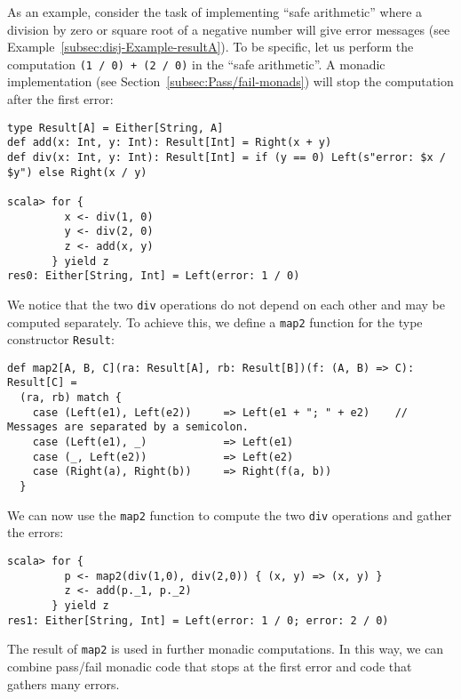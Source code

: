 As an example, consider the task of implementing \textsf{``}safe arithmetic\textsf{''}
where a division by zero or square root of a negative number will
give error messages (see Example~\ref{subsec:disj-Example-resultA}).
To be specific, let us perform the computation \lstinline!(1 / 0) + (2 / 0)!
in the \textsf{``}safe arithmetic\textsf{''}. A monadic implementation (see Section~\ref{subsec:Pass/fail-monads})
will stop the computation after the first error:
\begin{lstlisting}
type Result[A] = Either[String, A]
def add(x: Int, y: Int): Result[Int] = Right(x + y)
def div(x: Int, y: Int): Result[Int] = if (y == 0) Left(s"error: $x / $y") else Right(x / y)

scala> for {
         x <- div(1, 0)
         y <- div(2, 0)
         z <- add(x, y)
       } yield z
res0: Either[String, Int] = Left(error: 1 / 0)
\end{lstlisting}
We notice that the two \lstinline!div! operations do not depend on
each other and may be computed separately. To achieve this, we define
a \lstinline!map2! function for the type constructor \lstinline!Result!:
\begin{lstlisting}
def map2[A, B, C](ra: Result[A], rb: Result[B])(f: (A, B) => C): Result[C] =
  (ra, rb) match {
    case (Left(e1), Left(e2))     => Left(e1 + "; " + e2)    // Messages are separated by a semicolon.
    case (Left(e1), _)            => Left(e1)
    case (_, Left(e2))            => Left(e2)
    case (Right(a), Right(b))     => Right(f(a, b))
  }
\end{lstlisting}
 We can now use the \lstinline!map2! function to compute the two
\lstinline!div! operations and gather the errors:
\begin{lstlisting}
scala> for {
         p <- map2(div(1,0), div(2,0)) { (x, y) => (x, y) }
         z <- add(p._1, p._2)
       } yield z
res1: Either[String, Int] = Left(error: 1 / 0; error: 2 / 0)
\end{lstlisting}
The result of \lstinline!map2! is used in further monadic computations.
In this way, we can combine pass/fail monadic code that stops at the
first error and code that gathers many errors.

